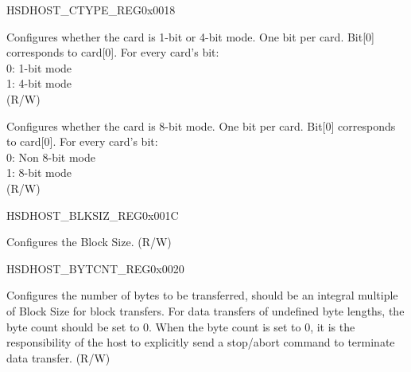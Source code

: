 \begin{register}{H}{SDHOST\_CTYPE\_REG}{0x0018}\label{regdesc:SDHOSTCTYPEREG}
%
%
%
%
\regnewline%
\begin{regdesc}\begin{reglist}
\label{fielddesc:SDHOSTCARDWIDTH4}\item [SDHOST\_CARD\_WIDTH4] Configures whether the card is 1-bit or 4-bit mode. One bit per card. Bit[0] corresponds to card[0]. For every card's bit:\\
0: 1-bit mode\\
1: 4-bit mode\\
(R/W)
\label{fielddesc:SDHOSTCARDWIDTH8}\item [SDHOST\_CARD\_WIDTH8] Configures whether the card is 8-bit mode. One bit per card. Bit[0] corresponds to card[0]. For every card's bit:\\
0: Non 8-bit mode\\
1: 8-bit mode\\
(R/W)
\end{reglist}\end{regdesc}
\end{register}


\begin{register}{H}{SDHOST\_BLKSIZ\_REG}{0x001C}\label{regdesc:SDHOSTBLKSIZREG}
%
%
\regnewline%
\begin{regdesc}\begin{reglist}
\label{fielddesc:SDHOSTBLOCKSIZE}\item [SDHOST\_BLOCK\_SIZE] Configures the Block Size. (R/W)
\end{reglist}\end{regdesc}
\end{register}


\begin{register}{H}{SDHOST\_BYTCNT\_REG}{0x0020}\label{regdesc:SDHOSTBYTCNTREG}
%
\regnewline%
\begin{regdesc}\begin{reglist}
\label{fielddesc:SDHOSTBYTECOUNT}\item [SDHOST\_BYTE\_COUNT] Configures the number of bytes to be transferred, should be an integral multiple of Block Size for block transfers. For data transfers of undefined byte lengths, the byte count should be set to 0. When the byte count is set to 0, it is the responsibility of the host to explicitly send a stop/abort command to terminate data transfer. (R/W)
\end{reglist}\end{regdesc}
\end{register}


